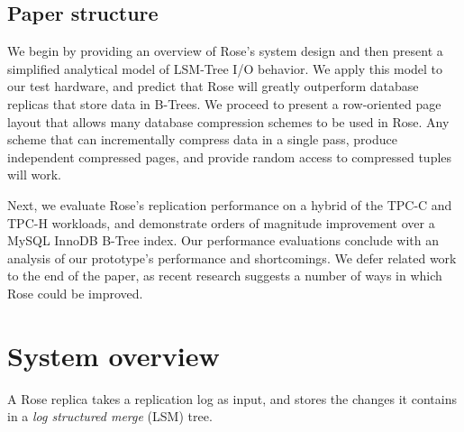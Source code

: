 \documentclass{vldb}
\newcommand{\rows}{Rose\xspace}
\newcommand{\rowss}{Rose's\xspace}
\begin{document}


\subsection{Paper structure}

We begin by providing an overview of \rowss system design and then
present a simplified analytical model of LSM-Tree I/O behavior.  We
apply this model to our test hardware, and predict that \rows will
greatly outperform database replicas that store data in B-Trees.  We
proceed to present a row-oriented page layout that allows many
database compression schemes to be used in \rows.  Any scheme that can
incrementally compress data in a single pass, produce independent
compressed pages, and provide random access to compressed tuples will
work.

Next, we
evaluate \rowss replication performance on a hybrid of the TPC-C and
TPC-H workloads, and demonstrate orders of magnitude improvement over
a MySQL InnoDB B-Tree index.  Our performance evaluations conclude
with an analysis of our prototype's performance and shortcomings.  We
defer related work to the end of the paper, as recent research
suggests a number of ways in which \rows could be improved.

\section{System overview}

A \rows replica takes a replication log as input, and stores the
changes it contains in a {\em log structured merge} (LSM)
tree\cite{lsm}.
\end{document}
